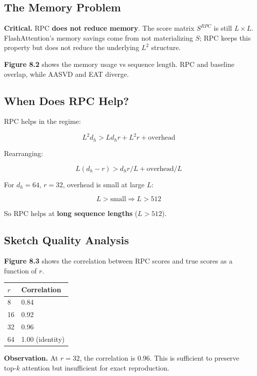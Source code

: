 \subsection{The Memory Problem}

\textbf{Critical.} RPC \textbf{does not reduce memory}. The score matrix 
$S^{RPC}$ is still $L \times L$. FlashAttention's memory savings come from 
not materializing $S$; RPC keeps this property but does not reduce the 
underlying $L^2$ structure.

\textbf{Figure 8.2} shows the memory usage vs sequence length. RPC and baseline 
overlap, while AASVD and EAT diverge.

\subsection{When Does RPC Help?}

RPC helps in the regime:

\[
L^2 d_h > L d_h r + L^2 r + \text{overhead}
\tag{8.1}
\]

Rearranging:

\[
L (d_h - r) > d_h r / L + \text{overhead} / L
\tag{8.2}
\]

For $d_h = 64$, $r = 32$, overhead is small at large $L$:

\[
L > \text{small} \Rightarrow L > 512
\]

So RPC helps at \textbf{long sequence lengths} ($L > 512$).

\subsection{Sketch Quality Analysis}

\textbf{Figure 8.3} shows the correlation between RPC scores and true scores as 
a function of $r$.

\begin{table}[H]
\centering
\small
\begin{tabular}{ll}
\toprule
\textbf{$r$} & \textbf{Correlation} \\
\midrule
8 & 0.84 \\
16 & 0.92 \\
32 & 0.96 \\
64 & 1.00 (identity) \\
\bottomrule
\end{tabular}
\end{table}

\textbf{Observation.} At $r = 32$, the correlation is 0.96. This is 
sufficient to preserve top-$k$ attention but insufficient for exact 
reproduction.

